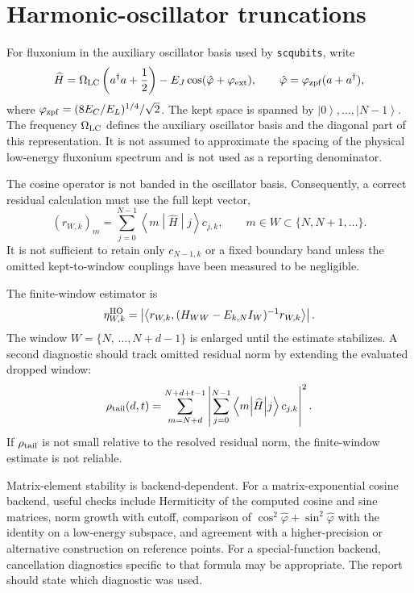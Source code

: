 \documentclass[11pt,a4paper]{article}
\newcommand{\ket}[1]{\left|#1\right\rangle}
\newcommand{\me}[3]{\left\langle#1\middle|#2\middle|#3\right\rangle}
\newcommand{\Hhat}{\widehat H}
\newcommand{\EJ}{E_J}
\newcommand{\EC}{E_C}
\newcommand{\EL}{E_L}
\newcommand{\wLC}{\Omega_{\rm LC}}
\newcommand{\zpf}{\varphi_{\rm zpf}}
\begin{document}
\section{Harmonic-oscillator truncations}
\label{sec:ho}

For fluxonium in the auxiliary oscillator basis used by \texttt{scqubits}, write
\begin{equation}
  \Hhat=\wLC\left(a^\dagger a+\frac12\right)-\EJ\cos(\hat\varphi+\varphi_{\rm ext}),
  \qquad \hat\varphi=\zpf(a+a^\dagger),
\end{equation}
where $\zpf=(8\EC/\EL)^{1/4}/\sqrt2$.  The kept space is spanned by $\ket 0,\ldots,\ket{N-1}$.  The frequency $\wLC$ defines the auxiliary oscillator basis and the diagonal part of this representation.  It is not assumed to approximate the spacing of the physical low-energy fluxonium spectrum and is not used as a reporting denominator.

The cosine operator is not banded in the oscillator basis.  Consequently, a correct residual calculation must use the full kept vector,
\begin{equation}
  (r_{W,k})_m=\sum_{j=0}^{N-1}\me{m}{\Hhat}{j}c_{j,k},\qquad m\in W\subset\{N,N+1,\ldots\}.
\end{equation}
It is not sufficient to retain only $c_{N-1,k}$ or a fixed boundary band unless the omitted kept-to-window couplings have been measured to be negligible.

The finite-window estimator is
\begin{equation}
  \eta_{W,k}^{\rm HO}=\left|\left\langle r_{W,k},(H_{WW}-E_{k,N}I_W)^{-1}r_{W,k}\right\rangle\right|.
\end{equation}
The window $W=\{N,\,\ldots,N+d-1\}$ is enlarged until the estimate stabilizes.  A second diagnostic should track omitted residual norm by extending the evaluated dropped window:
\begin{equation}
  \rho_{\rm tail}(d,t)=\sum_{m=N+d}^{N+d+t-1}\left|\sum_{j=0}^{N-1}\me{m}{\Hhat}{j}c_{j,k}\right|^2.
\end{equation}
If $\rho_{\rm tail}$ is not small relative to the resolved residual norm, the finite-window estimate is not reliable.

Matrix-element stability is backend-dependent.  For a matrix-exponential cosine backend, useful checks include Hermiticity of the computed cosine and sine matrices, norm growth with cutoff, comparison of $\cos^2\hat\varphi+\sin^2\hat\varphi$ with the identity on a low-energy subspace, and agreement with a higher-precision or alternative construction on reference points.  For a special-function backend, cancellation diagnostics specific to that formula may be appropriate.  The report should state which diagnostic was used.
\end{document}
